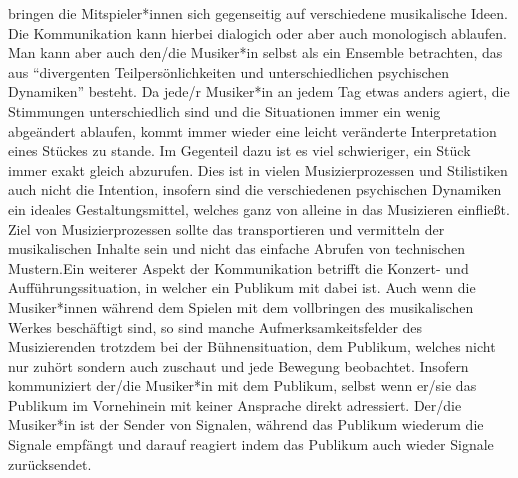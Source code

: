 bringen die Mitspieler*innen sich gegenseitig auf verschiedene musikalische
Ideen. Die Kommunikation kann hierbei dialogich oder aber auch monologisch
ablaufen. \autocite[61]{doerne:umfassend_musizieren} Man kann aber auch den/die
Musiker*in selbst als ein Ensemble betrachten, das aus \enquote{divergenten
Teilpersönlichkeiten und unterschiedlichen psychischen Dynamiken} besteht.
\autocite[64]{doerne:umfassend_musizieren} Da jede/r Musiker*in an jedem Tag
etwas anders agiert, die Stimmungen unterschiedlich sind und die Situationen
immer ein wenig abgeändert ablaufen, kommt immer wieder eine leicht veränderte
Interpretation eines Stückes zu stande.  Im Gegenteil dazu ist es viel
schwieriger, ein Stück immer exakt gleich abzurufen. Dies ist in vielen
Musizierprozessen und Stilistiken auch nicht die Intention, insofern sind die
verschiedenen psychischen Dynamiken ein ideales Gestaltungsmittel, welches ganz
von alleine in das Musizieren einfließt. Ziel von Musizierprozessen sollte das
transportieren und vermitteln der musikalischen Inhalte sein und nicht das
einfache Abrufen von technischen Mustern.Ein weiterer Aspekt der Kommunikation
betrifft die Konzert- und Aufführungssituation, in welcher ein Publikum mit
dabei ist. Auch wenn die Musiker*innen während dem Spielen mit dem
vollbringen des musikalischen Werkes beschäftigt sind, so sind manche
Aufmerksamkeitsfelder des Musizierenden trotzdem bei der Bühnensituation, dem
Publikum, welches nicht nur zuhört sondern auch zuschaut und jede Bewegung
beobachtet. Insofern kommuniziert der/die Musiker*in mit dem Publikum, selbst
wenn er/sie das Publikum im Vornehinein mit keiner Ansprache direkt adressiert.
Der/die Musiker*in ist der Sender von Signalen, während das Publikum wiederum
die Signale empfängt und darauf reagiert indem das Publikum auch wieder Signale
zurücksendet. 





